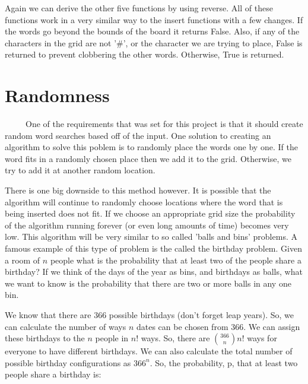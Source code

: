 \documentclass[12pt]{report}   %
\begin{document}
    \vspace{12pt}

    Again we can derive the other five functions by using reverse. All of these
    functions work in a very similar way to the insert functions with a few
    changes. If the words go beyond the bounds of the board it returns False.
    Also, if any of the characters in the grid are not '\#', or the character
    we are trying to place, False is returned to prevent clobbering the other
    words. Otherwise, True is returned.

\section*{Randomness}
    \ \ \ \ \ One of the requirements that was set for this project is that it
    should create random word searches based off of the input. One solution to
    creating an algorithm to solve this poblem is to randomly place the words
    one by one. If the word fits in a randomly chosen place then we add it to
    the grid. Otherwise, we try to add it at another random location.

    \vspace{12pt}

    There is one big downside to this method however. It is possible that the
    algorithm will continue to randomly choose locations where the word that
    is being inserted does not fit. If we choose an appropriate grid size the
    probability of the algorithm running forever (or even long amounts of time)
    becomes very low. This algorithm will be very similar to so called 'balls
    and bins' problems. A famous example of this type of problem is the called
    the birthday problem. Given a room of $n$ people what is the probability 
    that at least two of the people share a birthday? If we think of the days
    of the year as bins, and birthdays as balls, what we want to know is the
    probability that there are two or more balls in any one bin.

    \vspace{12pt}

    We know that there are 366 possible birthdays (don't forget leap years). 
    So, we can calculate the number of ways $n$ dates can be chosen from 366.
    We can assign these birthdays to the $n$ people in $n!$ ways. So, there
    are $ {{366} \choose {n}} n!$ ways for everyone to have different birthdays.
    We can also calculate the total number of possible birthday configurations
    as $366^{n}$. So, the probability, p, that at least two people share a
    birthday is:
\end{document}
